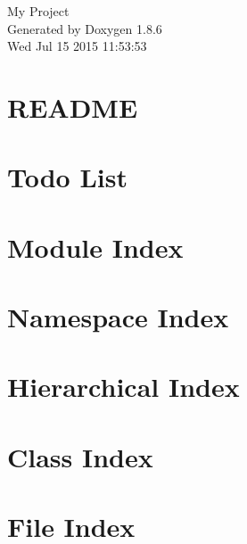 \documentclass[twoside]{book}
\newcommand{\clearemptydoublepage}{%
  \newpage{\pagestyle{empty}\cleardoublepage}%
}
\begin{document}
\hypersetup{pageanchor=false}
\begin{titlepage}
\vspace*{7cm}
\begin{center}%
{\Large My Project }\\
\vspace*{1cm}
{\large Generated by Doxygen 1.8.6}\\
\vspace*{0.5cm}
{\small Wed Jul 15 2015 11:53:53}\\
\end{center}
\end{titlepage}
\clearemptydoublepage
\tableofcontents
\clearemptydoublepage
{}
\hypersetup{pageanchor=true}

\chapter{R\-E\-A\-D\-M\-E}
\label{md__media_philipjhj_Data_OneDrive_Studie_Studenterprogramm_xC3_xB8r_SBS3_smartphonebrainscanner2-core_src_README}
\hypertarget{md__media_philipjhj_Data_OneDrive_Studie_Studenterprogramm_xC3_xB8r_SBS3_smartphonebrainscanner2-core_src_README}{}

\chapter{Todo List}
\label{todo}
\hypertarget{todo}{}

\chapter{Module Index}

\chapter{Namespace Index}

\chapter{Hierarchical Index}

\chapter{Class Index}

\chapter{File Index}

\end{document}
